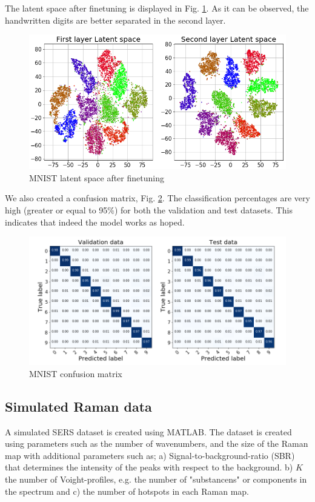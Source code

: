 \documentclass{article}
\begin{document}
The latent space after finetuning is displayed in Fig. \ref{fig:separationMNIST}. As it can be observed, the handwritten digits are better separated in the second layer.
\begin{figure}[H]
	\centering
	\includegraphics[width=1\linewidth]{latent_space_finetune_no_legend.png}  
	\caption{MNIST latent space after finetuning}
	\label{fig:separationMNIST} 
\end{figure}

We also created a confusion matrix, Fig. \ref{fig:confusionMNIST}. The classification percentages are very high (greater or equal to 95\%) for both the validation and test datasets. This indicates that indeed the model works as hoped.

\begin{figure}[H]
   \centering
	\includegraphics[width=1\linewidth]{Confusion_matrix_fine_tune_2.png}  
	\caption{MNIST confusion matrix}
	\label{fig:confusionMNIST} 
\end{figure}


\subsection{Simulated Raman data}
A simulated SERS dataset is created using MATLAB. The dataset is created using parameters such as the number of wavenumbers, and the size of the Raman map with additional parameters such as; a) Signal-to-background-ratio (SBR) that determines the intensity of the peaks with respect to the background. b) $K$ the number of Voight-profiles, e.g. the number of "substancens" or components in the spectrum and c) the number of hotspots in each Raman map.
\end{document}

